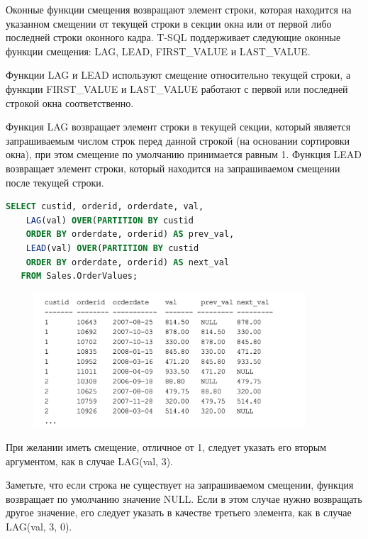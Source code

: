 Оконные функции смещения возвращают элемент строки, которая находится на
указанном смещении от текущей строки в секции окна или от первой либо последней строки оконного кадра. T-SQL поддерживает следующие оконные функции
смещения: LAG, LEAD, FIRST\_VALUE и LAST\_VALUE.

Функции LAG и LEAD используют смещение относительно текущей строки, а функции FIRST\_VALUE и LAST\_VALUE работают с первой или последней строкой окна соответственно. 

Функция LAG возвращает элемент строки в текущей секции, который является запрашиваемым числом
строк перед данной строкой (на основании сортировки окна), при этом смещение
по умолчанию принимается равным 1. Функция LEAD возвращает элемент строки,
который находится на запрашиваемом смещении после текущей строки. 


\begin{lstlisting}[label=lst:funcReturn, language=sql]
	SELECT custid, orderid, orderdate, val,
	LAG(val) OVER(PARTITION BY custid
	ORDER BY orderdate, orderid) AS prev_val,
	LEAD(val) OVER(PARTITION BY custid
	ORDER BY orderdate, orderid) AS next_val
   FROM Sales.OrderValues; 
\end{lstlisting}

\begin{figure}[h!]
	\begin{center}
		\includegraphics[width=0.9\textwidth]{img/res10.png}
	\end{center}
	\captionsetup{justification=centering}
\end{figure}

При желании иметь смещение, отличное от 1,
следует указать его вторым аргументом, как в случае LAG(val, 3). 

Заметьте, что если строка не существует на запрашиваемом смещении, функция
возвращает по умолчанию значение NULL. Если в этом случае нужно возвращать
другое значение, его следует указать в качестве третьего элемента, как в случае
LAG(val, 3, 0). 


